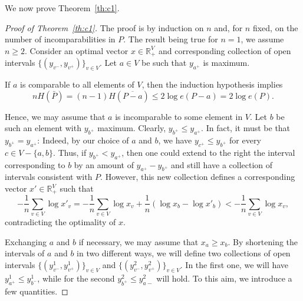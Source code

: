\documentclass{article} \usepackage{fullpage}
\begin{document}
We now prove Theorem~\ref{th:c1}.

\begin{proof}[Proof of Theorem~\ref{th:c1}]
The proof is by induction on $n$ and, for $n$ fixed, on the number of incomparabilities in $P$. The result being true for $n = 1$, we assume $n \geq 2$. Consider an optimal vector $x \in \mathbb{R}_+^V$ and corresponding collection of open intervals $\{(y_{v^-},y_{v^+})\}_{v \in V}$.
Let $a \in V$ be such that $y_{a^+}$ is maximum.

If $a$ is comparable to all elements of $V$, then the induction hypothesis implies
$$
n H(\bar{P}) = (n-1) H(\overline{P - a}) \leq 2\log e(P - a) = 2\log e(P).
$$

Hence, we may assume that $a$ is incomparable to some element in $V$. Let $b$ be such an element
with $y_{b^+}$ maximum. Clearly, $y_{b^+} \leq y_{a^+}$.
In fact, it must be that $y_{b^+} = y_{a^+}$: Indeed, by our choice of $a$ and $b$,
we have $y_{c^+} \leq y_{b^+}$ for every $c\in V - \{a,b\}$. Thus, if $y_{b^+} < y_{a^+}$,
then one could extend to the right the interval corresponding to $b$
by an amount of $y_{a^+} - y_{b^+}$ and still
have a collection of intervals consistent with $P$. However, this new collection
defines a corresponding vector $x' \in \mathbb{R}_+^V$ such that
$$
- \frac{1}{n} \sum_{v \in V} \log x'_v
= - \frac{1}{n} \sum_{v \in V} \log x_v + \frac{1}{n} (\log x_{b} - \log x'_{b})
< - \frac{1}{n} \sum_{v \in V} \log x_v,
$$
contradicting the optimality of $x$.

Exchanging $a$ and $b$ if necessary, we may assume that $x_{a} \geq x_{b}$.
By shortening the intervals of $a$ and $b$ in two different ways,
we will define two collections of open intervals
$\{(y^{1}_{v^-},y^{1}_{v^+})\}_{v \in V}$ and $\{(y^{2}_{v^-},y^{2}_{v^+})\}_{v \in V}$.
In the first one, we will have $y^{1}_{a^+} \leq y^{1}_{b^-}$, while for the second $y^{2}_{b^+} \leq y^{2}_{a-}$ will hold. To this aim, we introduce a few quantities.


\end{proof}
\end{document}
